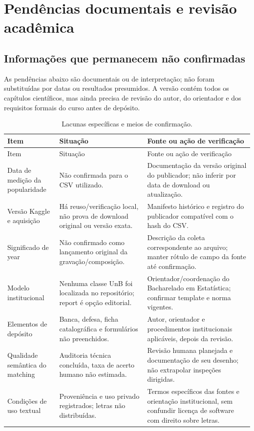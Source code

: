 \chapter{Pendências documentais e revisão acadêmica}\label{ap:pendencias}
\section{Informações que permanecem não confirmadas}
As pendências abaixo são documentais ou de interpretação; não foram substituídas por datas ou resultados presumidos. A versão contém todos os capítulos científicos, mas ainda precisa de revisão do autor, do orientador e dos requisitos formais do curso antes de depósito.

\begingroup\small\singlespacing
\begin{longtable}{>{\raggedright\arraybackslash}p{}>{\raggedright\arraybackslash}p{}>{\raggedright\arraybackslash}p{}}
\caption{Lacunas específicas e meios de confirmação.}\label{tab:pendencias}\\
\toprule Item & Situação & Fonte ou ação de verificação \\\midrule\endfirsthead
\toprule Item & Situação & Fonte ou ação de verificação \\\midrule\endhead
\bottomrule\endfoot
Data de medição da popularidade & Não confirmada para o CSV utilizado. & Documentação da versão original do publicador; não inferir por data de download ou atualização.\\
Versão Kaggle e aquisição & Há reuso/verificação local, não prova de download original ou versão exata. & Manifesto histórico e registro do publicador compatível com o hash do CSV.\\
Significado de year & Não confirmado como lançamento original da gravação/composição. & Descrição da coleta correspondente ao arquivo; manter rótulo de campo da fonte até confirmação.\\
Modelo institucional & Nenhuma classe UnB foi localizada no repositório; report é opção editorial. & Orientador/coordenação do Bacharelado em Estatística; confirmar template e norma vigentes.\\
Elementos de depósito & Banca, defesa, ficha catalográfica e formulários não preenchidos. & Autor, orientador e procedimentos institucionais aplicáveis, depois da revisão.\\
Qualidade semântica do matching & Auditoria técnica concluída, taxa de acerto humano não estimada. & Revisão humana planejada e documentação de seu desenho; não extrapolar inspeções dirigidas.\\
Condições de uso textual & Proveniência e uso privado registrados; letras não distribuídas. & Termos específicos das fontes e orientação institucional, sem confundir licença de software com direito sobre letras.\\
\end{longtable}\endgroup

